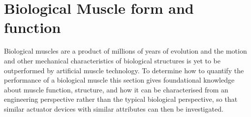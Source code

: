 %
%


\section{Biological Muscle form and function}

Biological muscles are a product of millions of years of evolution and the motion and other mechanical characteristics of biological structures is yet to be outperformed by artificial muscle technology. To determine how to quantify the performance of a biological muscle this section gives foundational knowledge about muscle function, structure, and how it can be characterised from an engineering perspective rather than the typical biological perspective, so that similar actuator devices with similar attributes can then be investigated.


